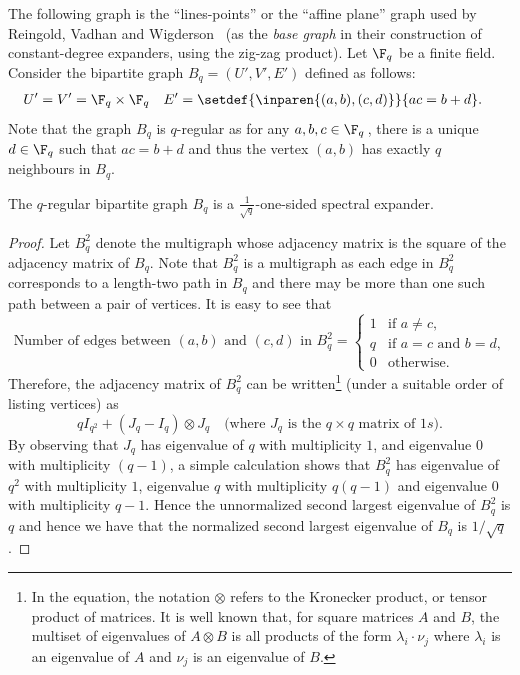 \documentclass{toc}
\begin{document}
The following graph is the ``lines-points'' or the ``affine plane'' graph used by Reingold, Vadhan and Wigderson~\cite{ReingoldVW2005} (as the \emph{base graph} in
their  %
 construction of constant-degree expanders, using the zig-zag product). 
Let $\F_q$ be a finite field.
Consider the bipartite graph $B_q = (U',V', E')$ defined as follows:
\begin{align*}
%
%
%
U'=V' & = \F_q \times \F_q &E' & = \setdef{\inparen{(a,b),(c,d)}}{ac = b+d}.%
\end{align*}
Note that the graph $B_q$ is $q$-regular as for any 
%
%
$a,b,c \in \F_q\,$,  %
there is a unique $d \in \F_q$ such that $ac = b+d$ and thus the vertex $(a,b)$ has exactly $q$ neighbours in $B_q$. 
\begin{lemma}
  The $q$-regular bipartite graph $B_q$ is a
  $\frac{1}{\sqrt{q}}$-one-sided spectral expander.
\end{lemma}
\begin{proof}
  Let $B_q^2$ denote the multigraph whose adjacency matrix is the 
  square of the adjacency matrix of $B_q$. 
  Note that $B_q^2$ is a multigraph as each edge in $B_q^2$ corresponds to
%
a length-two path  %
in $B_q$ and there may be more than one such path between a pair of vertices. 
%
%
%
It is easy to see that
\[
%
\text{Number of edges between $(a,b)$ and $(c,d)$ in $B_q^2$} =
\begin{cases} 1 & \text{if $a \neq c$,}\\
      q & \text{if $a = c$ and $b = d$,}\\
      0 & \text{otherwise.}
    \end{cases}
    \]
Therefore, the adjacency matrix of $B_q^2$
%
%
%
can be written\footnote{In the equation, the notation $\otimes$ refers to the
Kronecker product, or tensor product of matrices. It is well known
that, for square matrices $A$ and $B$, the
%
multiset  %
of eigenvalues of
%
$A \otimes B$  %
is all products of the form $\lambda_i \cdot \nu_j$ where $\lambda_i$ is an eigenvalue 
of $A$ and $\nu_j$ is an eigenvalue of $B$.} (under a suitable order of listing vertices) as
  \[
    q I_{q^2} + (J_q - I_q)\otimes J_q \quad\text{(where $J_q$ is the $q\times q$ matrix of $1s$)}.
  \]
  By observing that $J_q$ has eigenvalue of $q$ with multiplicity $1$, and eigenvalue $0$ with multiplicity $(q-1)$, a simple calculation shows that $B_q^2$ has eigenvalue of $q^2$ with multiplicity $1$, eigenvalue $q$ with multiplicity $q(q-1)$ and eigenvalue $0$ with multiplicity $q-1$. 
  Hence the unnormalized second largest eigenvalue of $B_q^2$ is $q$ and hence we have that the normalized second largest eigenvalue of $B_q$ is $1/\sqrt{q}$. 
\end{proof}
\end{document}
